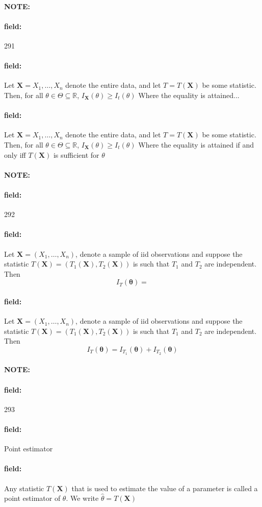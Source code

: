 \documentclass[12pt]{article}
\newenvironment{note}{\paragraph{NOTE:}}{}
\newenvironment{field}{\paragraph{field:}}{}
\begin{document}
\begin{note} \begin{field} \tiny 291 \end{field}
  \begin{field}
    Let $\mathbf{X} = X_1, \ldots , X_n$ denote the entire data, and let $T = T(\mathbf{X})$ be some statistic. Then, for all $\theta \in \Theta \subseteq \mathbb{R}$, $I_{\mathbf{X}} (\theta) \geq I_t(\theta)$
    Where the equality is attained...
  \end{field}
  \begin{field}
    Let $\mathbf{X} = X_1, \ldots , X_n$ denote the entire data, and let $T = T(\mathbf{X})$ be some statistic. Then, for all $\theta \in \Theta \subseteq \mathbb{R}$, $I_{\mathbf{X}} (\theta) \geq I_t(\theta)$
    Where the equality is attained if and only iff $T(\mathbf{X})$ is sufficient for $\theta$
  \end{field}
\end{note}

\begin{note} \begin{field} \tiny 292 \end{field}
  \begin{field}
    Let $\mathbf{X} = (X_1, \ldots , X_n)$, denote a sample of iid observations and suppose the statistic $T(\mathbf{X}) = (T_1(\mathbf{X}), T_2(\mathbf{X}))$ is such that $T_1$ and $T_2$ are independent. Then $$ I_{T}(\boldsymbol\theta) = $$
  \end{field}
  \begin{field}
    Let $\mathbf{X} = (X_1, \ldots , X_n)$, denote a sample of iid observations and suppose the statistic $T(\mathbf{X}) = (T_1(\mathbf{X}), T_2(\mathbf{X}))$ is such that $T_1$ and $T_2$ are independent. Then $$ I_{T}(\boldsymbol\theta) = I_{T_1}(\boldsymbol\theta) + I_{T_2}(\boldsymbol\theta)$$
  \end{field}
\end{note}

\begin{note} \begin{field} \tiny 293 \end{field}
  \begin{field}
    Point estimator
  \end{field}
  \begin{field}
    Any statistic $T(\mathbf{X})$ that is used to estimate the value of a parameter is called a point estimator of $\theta$. We write $\hat{\theta} = T(\mathbf{X})$
  \end{field}
\end{note}
\end{document}

